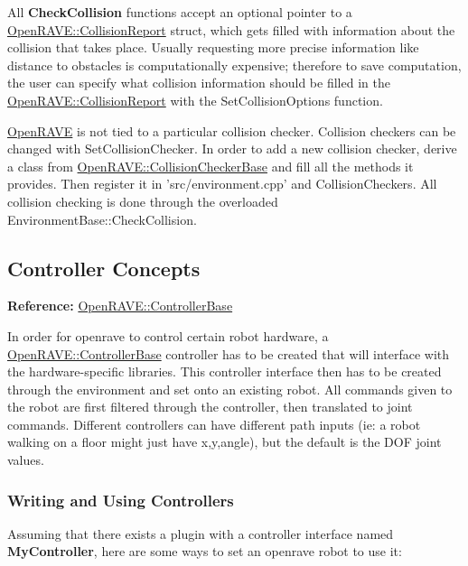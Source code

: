 All {\bfseries CheckCollision} functions accept an optional pointer to a \hyperlink{classOpenRAVE_1_1CollisionReport}{OpenRAVE::CollisionReport} struct, which gets filled with information about the collision that takes place. Usually requesting more precise information like distance to obstacles is computationally expensive; therefore to save computation, the user can specify what collision information should be filled in the \hyperlink{classOpenRAVE_1_1CollisionReport}{OpenRAVE::CollisionReport} with the SetCollisionOptions function.

\hyperlink{namespaceOpenRAVE}{OpenRAVE} is not tied to a particular collision checker. Collision checkers can be changed with SetCollisionChecker. In order to add a new collision checker, derive a class from \hyperlink{classOpenRAVE_1_1CollisionCheckerBase}{OpenRAVE::CollisionCheckerBase} and fill all the methods it provides. Then register it in 'src/environment.cpp' and CollisionCheckers. All collision checking is done through the overloaded EnvironmentBase::CheckCollision. \hypertarget{arch_controller}{}\subsection{Controller Concepts}\label{arch_controller}
{\bfseries Reference:} \hyperlink{classOpenRAVE_1_1ControllerBase}{OpenRAVE::ControllerBase}

In order for openrave to control certain robot hardware, a \hyperlink{classOpenRAVE_1_1ControllerBase}{OpenRAVE::ControllerBase} controller has to be created that will interface with the hardware-\/specific libraries. This controller interface then has to be created through the environment and set onto an existing robot. All commands given to the robot are first filtered through the controller, then translated to joint commands. Different controllers can have different path inputs (ie: a robot walking on a floor might just have x,y,angle), but the default is the DOF joint values.\hypertarget{arch__controller_arch_controller_writing}{}\subsubsection{Writing and Using Controllers}\label{arch__controller_arch_controller_writing}
Assuming that there exists a plugin with a controller interface named {\bfseries MyController}, here are some ways to set an openrave robot to use it:


